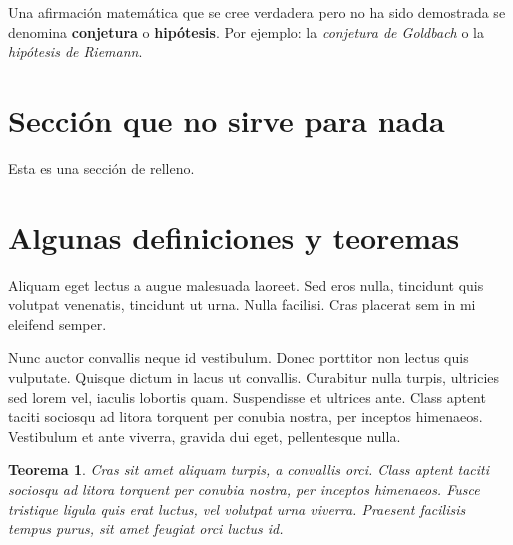 \documentclass[11pt,a4paper]{report}
\newtheorem{Teorema}[definicion]{Teorema}}
\begin{document}
Una afirmación matemática que se cree verdadera pero no ha sido demostrada se denomina \textbf{conjetura} o \textbf{hipótesis}. 
Por ejemplo: la \emph{conjetura de Goldbach} o la \emph{hipótesis de Riemann}.





\section{Sección que no sirve para nada}


Esta es una sección de relleno.









\section{Algunas definiciones y teoremas}




\begin{definicion}
Aliquam eget lectus a augue malesuada laoreet. Sed eros nulla, tincidunt quis volutpat venenatis, tincidunt ut urna. Nulla facilisi. Cras placerat sem in mi eleifend semper. 
\end{definicion}





\begin{definicion}
Nunc auctor convallis neque id vestibulum. Donec porttitor non lectus quis vulputate. Quisque dictum in lacus ut convallis. Curabitur nulla turpis, ultricies sed lorem vel, iaculis lobortis quam. Suspendisse et ultrices ante. Class aptent taciti sociosqu ad litora torquent per conubia nostra, per inceptos himenaeos. Vestibulum et ante viverra, gravida dui eget, pellentesque nulla.
\end{definicion}




\begin{Teorema}
Cras sit amet aliquam turpis, a convallis orci. Class aptent taciti sociosqu ad litora torquent per conubia nostra, per inceptos himenaeos. Fusce tristique ligula quis erat luctus, vel volutpat urna viverra. Praesent facilisis tempus purus, sit amet feugiat orci luctus id.
\end{Teorema}
\end{document}

